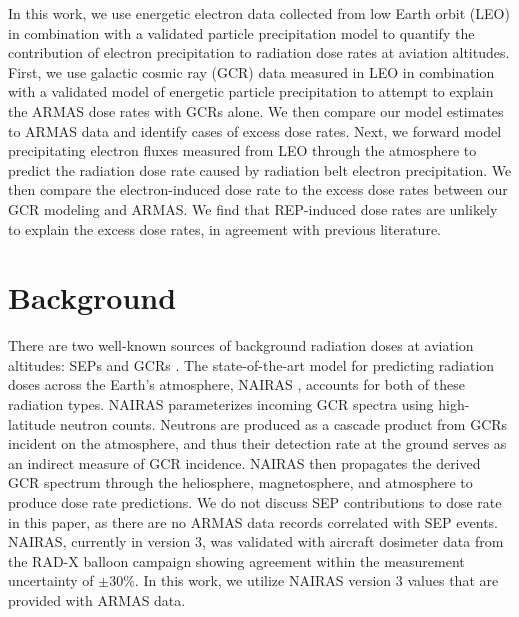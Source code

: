 \documentclass[draft]{agujournal2019}
\begin{document}
In this work, we use energetic electron data collected from low Earth orbit (LEO) in combination with a validated particle precipitation model to quantify the contribution of electron precipitation to radiation dose rates at aviation altitudes. First, we use galactic cosmic ray (GCR) data measured in LEO in combination with a validated model of energetic particle precipitation to attempt to explain the ARMAS dose rates with GCRs alone. We then compare our model estimates to ARMAS data and identify cases of excess dose rates. Next, we forward model precipitating electron fluxes measured from LEO through the atmosphere to predict the radiation dose rate caused by radiation belt electron precipitation. We then compare the electron-induced dose rate to the excess dose rates between our GCR modeling and ARMAS. We find that REP-induced dose rates are unlikely to explain the excess dose rates, in agreement with previous literature.

\section{Background}
There are two well-known sources of background radiation doses at aviation altitudes: SEPs and GCRs \cite{mertens2013}. The state-of-the-art model for predicting radiation doses across the Earth's atmosphere, NAIRAS \cite{mertens2013}, accounts for both of these radiation types. NAIRAS parameterizes incoming GCR spectra using high-latitude neutron counts. Neutrons are produced as a cascade product from GCRs incident on the atmosphere, and thus their detection rate at the ground serves as an indirect measure of GCR incidence. NAIRAS then propagates the derived GCR spectrum through the heliosphere, magnetosphere, and atmosphere to produce dose rate predictions. We do not discuss SEP contributions to dose rate in this paper, as there are no ARMAS data records correlated with SEP events. NAIRAS, currently in version 3, was validated with aircraft dosimeter data from the RAD-X balloon campaign showing agreement within the measurement uncertainty of $\pm 30\%$. In this work, we utilize NAIRAS version 3 values that are provided with ARMAS data.
\end{document}
